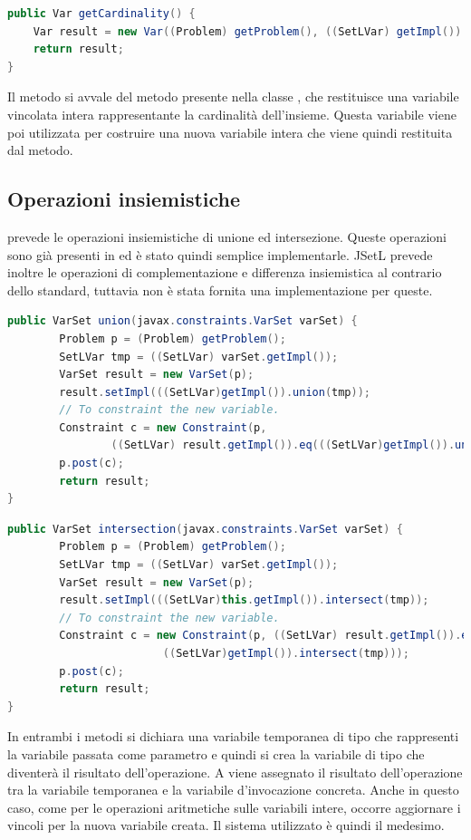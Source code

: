 \begin{lstlisting}[language = Java,
                   caption = {getter per la cardinalità.}]
public Var getCardinality() {
	Var result = new Var((Problem) getProblem(), ((SetLVar) getImpl()).card());
	return result;
}
\end{lstlisting}
Il metodo  si avvale del metodo  presente 
nella  classe , che
restituisce una variabile vincolata intera rappresentante la cardinalità 
dell'insieme. Questa variabile viene poi utilizzata per costruire una nuova
variabile intera   che viene quindi
restituita dal metodo.

\subsection{Operazioni insiemistiche}
 prevede le operazioni insiemistiche di unione ed intersezione.
Queste operazioni sono già presenti in  ed è stato quindi 
semplice implementarle. JSetL prevede inoltre le operazioni di complementazione
e differenza insiemistica al contrario dello standard, tuttavia non è stata
fornita una implementazione per queste.

\begin{lstlisting}[language = Java,
                   caption = {unione insiemistica.}]
public VarSet union(javax.constraints.VarSet varSet) {
        Problem p = (Problem) getProblem();
        SetLVar tmp = ((SetLVar) varSet.getImpl());
        VarSet result = new VarSet(p);
        result.setImpl(((SetLVar)getImpl()).union(tmp));
        // To constraint the new variable.
        Constraint c = new Constraint(p,
                ((SetLVar) result.getImpl()).eq(((SetLVar)getImpl()).union(tmp)));
        p.post(c);
        return result;
}
\end{lstlisting}

\begin{lstlisting}[language = Java,
                   caption = {intersezione insiemistica.}]
public VarSet intersection(javax.constraints.VarSet varSet) {
        Problem p = (Problem) getProblem();
        SetLVar tmp = ((SetLVar) varSet.getImpl());
        VarSet result = new VarSet(p);
        result.setImpl(((SetLVar)this.getImpl()).intersect(tmp));
        // To constraint the new variable.
        Constraint c = new Constraint(p, ((SetLVar) result.getImpl()).eq(
                        ((SetLVar)getImpl()).intersect(tmp)));
        p.post(c);
        return result;
}
\end{lstlisting}
In entrambi i metodi si dichiara una variabile temporanea di tipo 
 che rappresenti la variabile passata come parametro e quindi si 
crea la variabile di tipo  che diventerà il risultato 
dell'operazione. A  viene assegnato il risultato
dell'operazione tra la variabile temporanea e la variabile d'invocazione 
concreta. Anche in questo caso, come per le operazioni aritmetiche sulle
variabili intere, occorre aggiornare i vincoli per la nuova variabile creata.
Il sistema utilizzato è quindi il medesimo.


